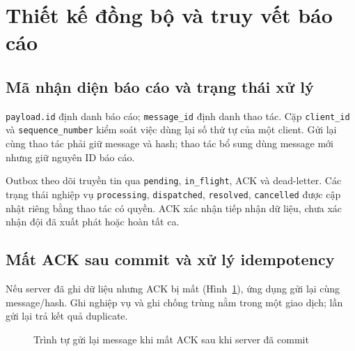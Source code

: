 \section{Thiết kế đồng bộ và truy vết báo cáo}\label{sec:synchronization-design}
\subsection{Mã nhận diện báo cáo và trạng thái xử lý}
\texttt{payload.id} định danh báo cáo; \texttt{message\_id} định danh thao tác. Cặp \texttt{client\_id} và \texttt{sequence\_number} kiểm soát việc dùng lại số thứ tự của một client. Gửi lại cùng thao tác phải giữ message và hash; thao tác bổ sung dùng message mới nhưng giữ nguyên ID báo cáo.

Outbox theo dõi truyền tin qua \texttt{pending}, \texttt{in\_flight}, ACK và dead-letter. Các trạng thái nghiệp vụ \texttt{processing}, \texttt{dispatched}, \texttt{resolved}, \texttt{cancelled} được cập nhật riêng bằng thao tác có quyền. ACK xác nhận tiếp nhận dữ liệu, chưa xác nhận đội đã xuất phát hoặc hoàn tất ca.

\subsection{Mất ACK sau commit và xử lý idempotency}
Nếu server đã ghi dữ liệu nhưng ACK bị mất (Hình~\ref{fig:sync-sequence}), ứng dụng gửi lại cùng message/hash. Ghi nghiệp vụ và ghi chống trùng nằm trong một giao dịch; lần gửi lại trả kết quả duplicate.

\begin{figure}[H]\centering
{}
\caption{Trình tự gửi lại message khi mất ACK sau khi server đã commit}
\label{fig:sync-sequence}
\end{figure}

